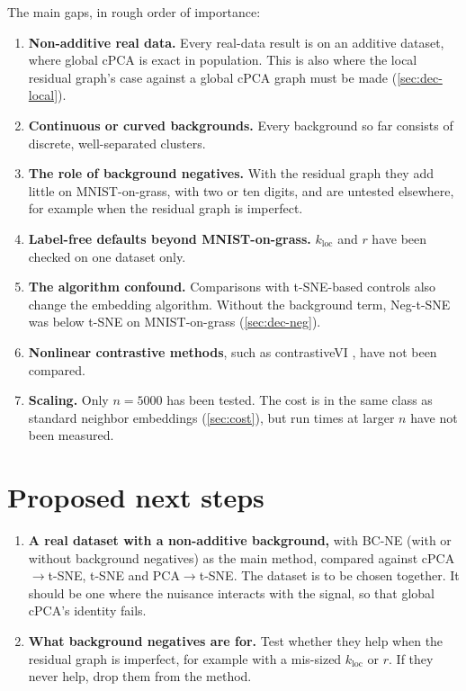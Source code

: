 \documentclass[10pt]{article}
\newcommand{\methodname}{BC-NE}
\newcommand{\kloc}{k_{\mathrm{loc}}}
\begin{document}
The main gaps, in rough order of importance:
\begin{enumerate}
  \item \textbf{Non-additive real data.} Every real-data result is on an additive dataset, where global cPCA is exact in population. This is also where the local residual graph's case against a global cPCA graph must be made (\cref{sec:dec-local}).
  \item \textbf{Continuous or curved backgrounds.} Every background so far consists of discrete, well-separated clusters.
  \item \textbf{The role of background negatives.} With the residual graph they add little on MNIST-on-grass, with two or ten digits, and are untested elsewhere, for example when the residual graph is imperfect.
  \item \textbf{Label-free defaults beyond MNIST-on-grass.} $\kloc$ and $r$ have been checked on one dataset only.
  \item \textbf{The algorithm confound.} Comparisons with t-SNE-based controls also change the embedding algorithm. Without the background term, Neg-t-SNE was below t-SNE on MNIST-on-grass (\cref{sec:dec-neg}).
  \item \textbf{Nonlinear contrastive methods}, such as contrastiveVI \cite{weinberger2023contrastivevi}, have not been compared.
  \item \textbf{Scaling.} Only $n = 5000$ has been tested. The cost is in the same class as standard neighbor embeddings (\cref{sec:cost}), but run times at larger $n$ have not been measured.
\end{enumerate}

\section{Proposed next steps}
\label{sec:next}

\begin{enumerate}
  \item \textbf{A real dataset with a non-additive background,} with \methodname{} (with or without background negatives) as the main method, compared against cPCA$\to$t-SNE, t-SNE and PCA$\to$t-SNE. The dataset is to be chosen together. It should be one where the nuisance interacts with the signal, so that global cPCA's identity fails.
  \item \textbf{What background negatives are for.} Test whether they help when the residual graph is imperfect, for example with a mis-sized $\kloc$ or $r$. If they never help, drop them from the method.
\end{enumerate}
\end{document}
